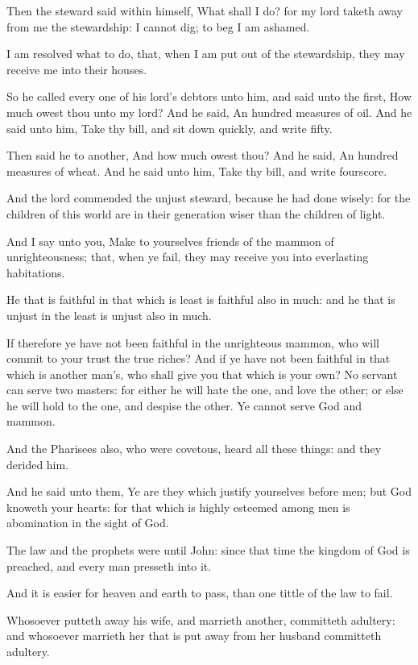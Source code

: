 \verse Then the steward said within himself, What shall I do? for my lord taketh away from me the stewardship: I cannot dig; to beg I am ashamed.

\verse I am resolved what to do, that, when I am put out of the stewardship, they may receive me into their houses.

\verse So he called every one of his lord's debtors unto him, and said unto the first, How much owest thou unto my lord?  \verse And he said, An hundred measures of oil. And he said unto him, Take thy bill, and sit down quickly, and write fifty.

\verse Then said he to another, And how much owest thou? And he said, An hundred measures of wheat. And he said unto him, Take thy bill, and write fourscore.

\verse And the lord commended the unjust steward, because he had done wisely: for the children of this world are in their generation wiser than the children of light.

\verse And I say unto you, Make to yourselves friends of the mammon of unrighteousness; that, when ye fail, they may receive you into everlasting habitations.

\verse He that is faithful in that which is least is faithful also in much: and he that is unjust in the least is unjust also in much.

\verse If therefore ye have not been faithful in the unrighteous mammon, who will commit to your trust the true riches?  \verse And if ye have not been faithful in that which is another man's, who shall give you that which is your own?  \verse No servant can serve two masters: for either he will hate the one, and love the other; or else he will hold to the one, and despise the other. Ye cannot serve God and mammon.

\verse And the Pharisees also, who were covetous, heard all these things: and they derided him.

\verse And he said unto them, Ye are they which justify yourselves before men; but God knoweth your hearts: for that which is highly esteemed among men is abomination in the sight of God.

\verse The law and the prophets were until John: since that time the kingdom of God is preached, and every man presseth into it.

\verse And it is easier for heaven and earth to pass, than one tittle of the law to fail.

\verse Whosoever putteth away his wife, and marrieth another, committeth adultery: and whosoever marrieth her that is put away from her husband committeth adultery.

